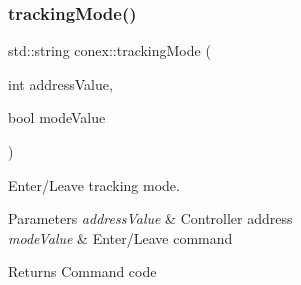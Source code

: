 \subsubsection{\texorpdfstring{tracking\+Mode()}{trackingMode()}}
{\footnotesize\ttfamily std\+::string conex\+::tracking\+Mode (\begin{DoxyParamCaption}\item[{int}]{address\+Value,  }\item[{bool}]{mode\+Value }\end{DoxyParamCaption})}



Enter/\+Leave tracking mode. 


\begin{DoxyParams}{Parameters}
{\em address\+Value} & Controller address \\
\hline
{\em mode\+Value} & Enter/\+Leave command \\
\hline
\end{DoxyParams}
\begin{DoxyReturn}{Returns}
Command code 
\end{DoxyReturn}
